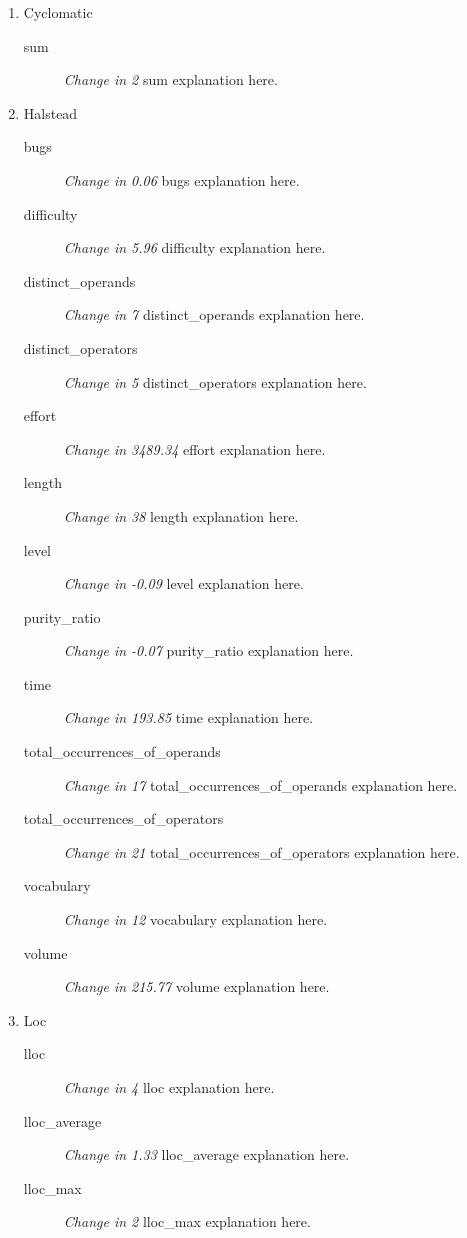 \begin{enumerate}
  \item Cyclomatic
        \begin{description}
          \item [sum] \textit{Change in 2} sum explanation here.
        \end{description}
  \item Halstead
        \begin{description}
          \item [bugs] \textit{Change in 0.06} bugs explanation here.
          \item [difficulty] \textit{Change in 5.96} difficulty explanation here.
          \item [distinct\_operands] \textit{Change in 7} distinct\_operands explanation here.
          \item [distinct\_operators] \textit{Change in 5} distinct\_operators explanation here.
          \item [effort] \textit{Change in 3489.34} effort explanation here.
          \item [length] \textit{Change in 38} length explanation here.
          \item [level] \textit{Change in -0.09} level explanation here.
          \item [purity\_ratio] \textit{Change in -0.07} purity\_ratio explanation here.
          \item [time] \textit{Change in 193.85} time explanation here.
          \item [total\_occurrences\_of\_operands] \textit{Change in 17} total\_occurrences\_of\_operands explanation here.
          \item [total\_occurrences\_of\_operators] \textit{Change in 21} total\_occurrences\_of\_operators explanation here.
          \item [vocabulary] \textit{Change in 12} vocabulary explanation here.
          \item [volume] \textit{Change in 215.77} volume explanation here.
        \end{description}
  \item Loc
        \begin{description}
          \item [lloc] \textit{Change in 4} lloc explanation here.
          \item [lloc\_average] \textit{Change in 1.33} lloc\_average explanation here.
          \item [lloc\_max] \textit{Change in 2} lloc\_max explanation here.

\end{description}
\end{enumerate}
